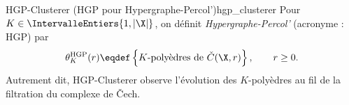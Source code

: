 
\begin{Definition}{HGP-Clusterer (HGP pour Hypergraphe-Percol')}{hgp_clusterer}
Pour $K\in \IntervalleEntiers{1,|\X|}$, on définit \emph{Hypergraphe-Percol'} (acronyme : HGP) par
\[
    \theta^{\mathrm{HGP}}_K(r) \eqdef \left\{\text{$K$-polyèdres de } \check C(\X,r)\right\},
    \qquad r\ge 0.
\]
Autrement dit, HGP-Clusterer observe l'évolution des $K$-polyèdres au fil de la filtration du complexe de \v Cech.
\end{Definition}



